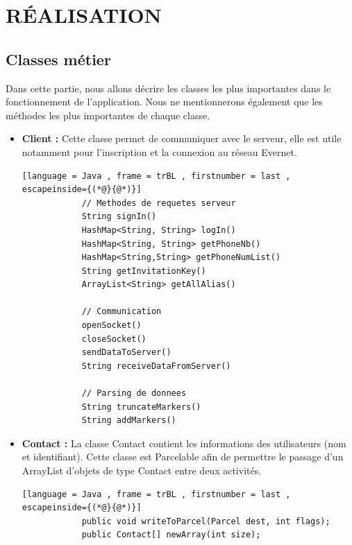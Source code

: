 \chapter{ RÉALISATION }

        \section{Classes métier}
        Dans cette partie, nous allons décrire les classes les plus importantes dans le fonctionnement de l'application. Nous ne mentionnerons également que les méthodes les plus importantes de chaque classe.
        \begin{itemize}
        \vspace{0.2cm}
            \item \textbf{Client :} Cette classe permet de communiquer avec le serveur, elle est utile notamment pour l'inscription et la connexion au réseau Evernet. 
            \begin{lstlisting}[language = Java , frame = trBL , firstnumber = last , escapeinside={(*@}{@*)}]
            // Methodes de requetes serveur
            String signIn()
            HashMap<String, String> logIn()
            HashMap<String, String> getPhoneNb()
            HashMap<String,String> getPhoneNumList()
            String getInvitationKey()
            ArrayList<String> getAllAlias()
            
            // Communication
            openSocket()
            closeSocket()
            sendDataToServer()
            String receiveDataFromServer()
            
            // Parsing de donnees
            String truncateMarkers()
            String addMarkers()
            \end{lstlisting}
            
           \vspace{0.2cm}
            \item \textbf{Contact :} La classe Contact contient les informations des utilisateurs (nom et identifiant). Cette classe est Parcelable afin de permettre le passage d'un ArrayList d'objets de type Contact entre deux activités.
            \begin{lstlisting}[language = Java , frame = trBL , firstnumber = last , escapeinside={(*@}{@*)}]
            public void writeToParcel(Parcel dest, int flags);
            public Contact[] newArray(int size);
            
            \end{lstlisting}
            

\end{itemize}
